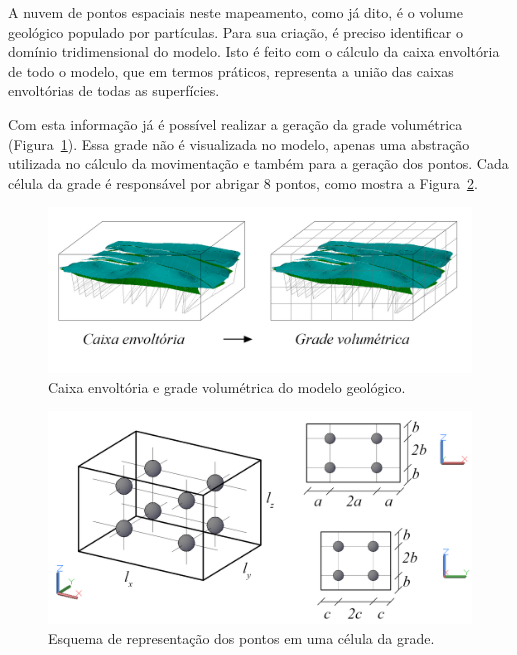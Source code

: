 A nuvem de pontos espaciais neste mapeamento, como já dito, é o volume geológico populado por partículas. Para sua criação, é preciso identificar o domínio tridimensional do modelo. Isto é feito com o cálculo da caixa envoltória de todo o modelo, que em termos práticos, representa a união das caixas envoltórias de todas as superfícies.

Com esta informação já é possível realizar a geração da grade volumétrica (Figura~\ref{fig-vol-grid}). Essa grade não é visualizada no modelo, apenas uma abstração utilizada no cálculo da movimentação e também para a geração dos pontos. Cada célula da grade é responsável por abrigar 8 pontos, como mostra a Figura~\ref{fig-vol-cell}.

\begin{figure} [H]
  \begin{center}
    \includegraphics[width=\textwidth]{images/fig-vol-grid}
    \caption{Caixa envoltória e grade volumétrica do modelo geológico.}\label{fig-vol-grid}
  \end{center}
\end{figure}

\begin{figure} [H]
  \begin{center}
    \includegraphics[width=\textwidth]{images/fig-vol-cell}
    \caption{Esquema de representação dos pontos em uma célula da grade.}\label{fig-vol-cell}
  \end{center}
\end{figure}

